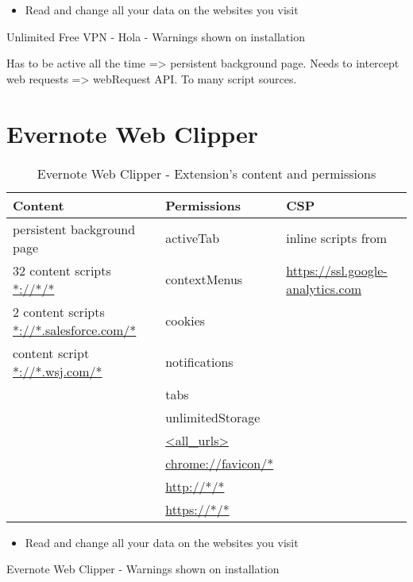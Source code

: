 	\begin{listing}
		\begin{itemize}
			\item  Read and change all your data on the websites you visit
		\end{itemize}
		\caption{Unlimited Free VPN - Hola - Warnings shown on installation}
	\end{listing}
	
	Has to be active all the time => persistent background page. Needs to intercept web requests => webRequest API. 
	To many script sources.
	
\section{Evernote Web Clipper}
	
	\begin{table}[h]
		\centering
		\begin{tabular}{|l|l|l|} \hline
			\textbf{Content} & \textbf{Permissions} & \textbf{CSP} \\ \hline
			persistent background page & activeTab & inline scripts from  \\
			32 content scripts  \url{*://*/*} & contextMenus & \hspace{1em} \url{https://ssl.google-analytics.com} \\
			2 content scripts \url{*://*.salesforce.com/*} & cookies & \\ 
			content script \url{*://*.wsj.com/*} & notifications & \\ 
			& tabs & \\ 
			& unlimitedStorage & \\ 
			& \url{<all_urls>} & \\ 
			& \url{chrome://favicon/*} & \\ 
			& \url{http://*/*} & \\ 
			& \url{https://*/*} & \\ \hline
		\end{tabular}
		\caption{Evernote Web Clipper - Extension's content and permissions}
	\end{table}
	
	\begin{listing}
		\begin{itemize}
			\item  Read and change all your data on the websites you visit
		\end{itemize}
		\caption{Evernote Web Clipper - Warnings shown on installation}
	\end{listing}



